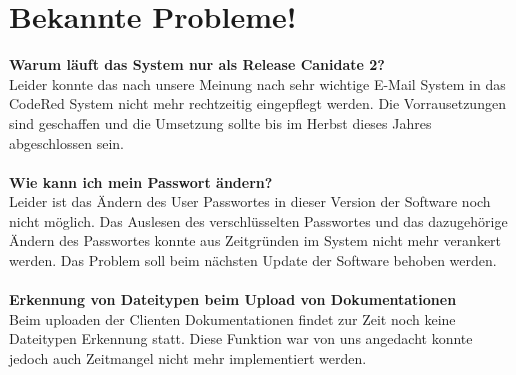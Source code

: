\chapter{Bekannte Probleme!}  %
\label{chapter:Bekannte Probleme!}  %

\textbf{Warum läuft das System nur als Release Canidate 2?} \\
Leider konnte das nach unsere Meinung nach sehr wichtige E-Mail System in das CodeRed System nicht mehr rechtzeitig eingepflegt werden. Die Vorrausetzungen sind geschaffen und die Umsetzung sollte bis im Herbst dieses Jahres abgeschlossen sein. \\
\\
\textbf{Wie kann ich mein Passwort ändern?}\\
Leider ist das Ändern des User Passwortes in dieser Version der Software noch nicht möglich. Das Auslesen des verschlüsselten Passwortes und das dazugehörige Ändern des Passwortes konnte aus Zeitgründen im System nicht mehr verankert werden. 
Das Problem soll beim nächsten Update der Software behoben werden. \\
\\
\textbf{Erkennung von Dateitypen beim Upload von Dokumentationen}\\
Beim uploaden der Clienten Dokumentationen findet zur Zeit noch keine Dateitypen Erkennung statt. Diese Funktion war von uns angedacht konnte jedoch auch Zeitmangel nicht mehr implementiert werden. 
